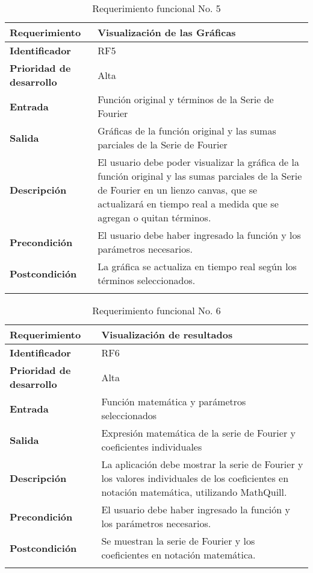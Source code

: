 \begin{longtable}{|m{3.5cm}|m{9.5cm}|}
	\hline
	\rowcolor{black!75} \color{white}\textbf{Requerimiento} & \color{white}\textbf{Visualización de las Gráficas} \\
	\hline
	\textbf{Identificador} & RF5 \\
	\hline
	\textbf{Prioridad de desarrollo} & Alta \\
	\hline
	\textbf{Entrada} & Función original y términos de la Serie de Fourier \\
	\hline
	\textbf{Salida} & Gráficas de la función original y las sumas parciales de la Serie de Fourier \\
	\hline
	\textbf{Descripción} & El usuario debe poder visualizar la gráfica de la función original y las sumas parciales de la Serie de Fourier en un lienzo canvas, que se actualizará en tiempo real a medida que se agregan o quitan términos. \\
	\hline
	\textbf{Precondición} & El usuario debe haber ingresado la función y los parámetros necesarios. \\
	\hline
	\textbf{Postcondición} & La gráfica se actualiza en tiempo real según los términos seleccionados. \\
	\hline
	\rowcolor{white} \caption{Requerimiento funcional No. 5} \label{tabla:RF5} \\
\end{longtable}


\begin{longtable}{|m{3.5cm}|m{9.5cm}|}
	\hline
	\rowcolor{black!75} \color{white}\textbf{Requerimiento} & \color{white}\textbf{Visualización de resultados} \\
	\hline
	\textbf{Identificador} & RF6 \\
	\hline
	\textbf{Prioridad de desarrollo} & Alta \\
	\hline
	\textbf{Entrada} & Función matemática y parámetros seleccionados \\
	\hline
	\textbf{Salida} & Expresión matemática de la serie de Fourier y coeficientes individuales \\
	\hline
	\textbf{Descripción} & La aplicación debe mostrar la serie de Fourier y los valores individuales de los coeficientes en notación matemática, utilizando MathQuill. \\
	\hline
	\textbf{Precondición} & El usuario debe haber ingresado la función y los parámetros necesarios. \\
	\hline
	\textbf{Postcondición} & Se muestran la serie de Fourier y los coeficientes en notación matemática. \\
	\hline
	\rowcolor{white} \caption{Requerimiento funcional No. 6} \label{tabla:RF6} \\
\end{longtable}


